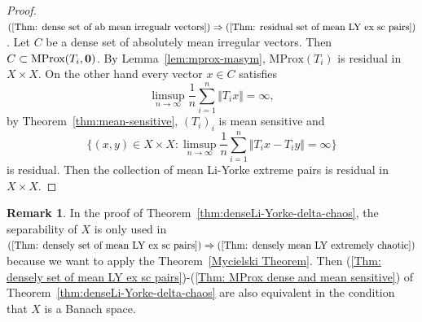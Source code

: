 \documentclass[12pt,a4paper]{amsart}
\theoremstyle{definition}
\newtheorem{rem}[defn]{Remark}
\theoremstyle{plain}
\begin{document}
\begin{proof}
    $(\ref{Thm: dense set of ab mean irregualr vectors}) \Rightarrow (\ref{Thm: residual set of mean LY ex sc pairs})$.
    Let $C$ be a dense set of absolutely mean irregular vectors.
    Then $C\subset \text{MProx}(T_i, {\bf 0})$.
    By Lemma~\ref{lem:mprox-masym},  $\text{MProx}(T_i)$ is residual in $X\times X$.
    On the other hand every vector $x\in C$ satisfies
    \[
        \limsup_{n\to \infty} \frac{1}{n} \sum_{i=1}^{n} \Vert T_ix \Vert =\infty,
    \]
    by Theorem~\ref{thm:mean-sensitive},
    $(T_i)_i$ is mean sensitive and
    \[
        \biggl\{(x, y)\in X\times X:  \limsup_{n\to \infty} \frac{1}{n} \sum_{i=1}^{n} \Vert T_ix-T_iy \Vert =\infty\biggr\}
    \]
    is residual. Then the collection of  mean Li-Yorke extreme pairs is residual in $X\times X$.
\end{proof}

\begin{rem}\label{rem:separability-of-X}
In the proof of Theorem~\ref{thm:denseLi-Yorke-delta-chaos}, the separability of $X$ is only used in  $(\ref{Thm: densely set of mean LY ex sc pairs}) \Rightarrow (\ref{Thm: densely mean LY extremely chaotic})$ because  we want to apply the Theorem~\ref{Mycielski Theorem}.
Then 
(\ref{Thm: densely set of mean LY ex sc pairs})-(\ref{Thm: MProx dense and mean sensitive}) of Theorem~\ref{thm:denseLi-Yorke-delta-chaos}
are also equivalent in the condition that $X$ is a Banach space.
\end{rem}
\end{document}
